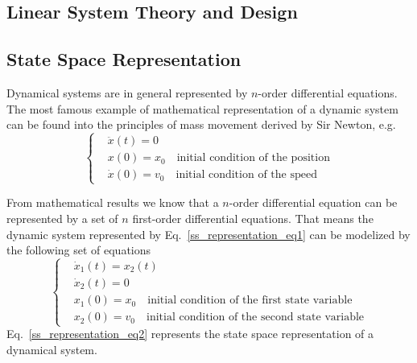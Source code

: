 \documentclass[12pt,a4paper,oneside]{book}
\begin{document}
\begin{onehalfspace}
\chapter{Linear System Theory and Design}
\section{State Space Representation}
Dynamical systems are in general represented by $n$-order differential 
equations. 
The most famous example of mathematical representation of a dynamic system can 
be found into the principles of mass movement derived by Sir Newton, e.g.
\begin{equation}\label{ss_representation_eq1}
	\left\lbrace \begin{aligned}
		&\ddot{x}(t)=0 \\[6pt]
		&x(0)=x_0\quad\text{initial condition of the position} \\[6pt]		
		&\dot{x}(0)=v_0\quad\text{initial condition of the speed}
	\end{aligned}\right. 
\end{equation} 

From mathematical results we know that a $n$-order differential equation can be 
represented by a set of $n$ first-order differential equations. That means the 
dynamic system represented by Eq.~\eqref{ss_representation_eq1} can be  
modelized by the following set of equations
\begin{equation}\label{ss_representation_eq2}
	\left\lbrace \begin{aligned}
		&\dot{x}_1(t)=x_2(t) \\[6pt]
		&\dot{x}_2(t)=0 \\[6pt]
		&x_1(0)=x_0\quad\text{initial condition of the first state variable} \\[6pt]		
		&x_2(0)=v_0\quad\text{initial condition of the second state variable}
	\end{aligned}\right. 
\end{equation} 
Eq.~\eqref{ss_representation_eq2} represents the state space representation of 
a dynamical system. 


\end{onehalfspace}
\end{document}
